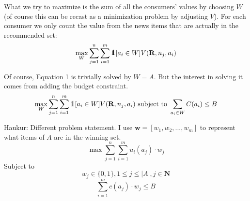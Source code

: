 \documentclass[10pt,a4paper]{article}
\def\one{\mbox{1\hspace{-4.25pt}\fontsize{12}{14.4}\selectfont\textrm{1}}} %
\begin{document}
What we try to maximize is the sum of all the consumers' values by choosing $W$ (of course this can be recast as a minimization problem by adjusting $V$). For each consumer we only count the value from the news items that are actually in the recommended set:\\
\begin{equation}
\max_W \sum_{j=1}^n \sum_{i=1}^m \one [a_i\in W] V(\mathbf{R}, n_j, a_i)
\end{equation}

Of course, Equation 1 is trivially solved by $W=A$. But the interest in solving it comes from adding the budget constraint.
\begin{equation}
\max_W \sum_{j=1}^n \sum_{i=1}^m \one [a_i\in W] V(\mathbf{R}, n_j, a_i) \text{ subject to } \sum_{a_i \in W} C(a_i) \leq B
\end{equation}

Haukur: Different problem statement. I use $\boldsymbol{w}=[w_1, w_2, ..., w_m]$ to represent what items of $A$ are in the winning set.
\begin{equation}
\max \sum_{j=1}^n \sum_{i=1}^m u_i(a_j)\cdot w_j
\end{equation}
Subject to
\begin{equation}
w_j \in \{0,1\}, 1 \leq j \leq |A|, j \in \mathbf{N}
\end{equation}
\begin{equation}
\sum_{i=1}^m c(a_j)\cdot w_j \leq B
\end{equation}
\end{document}
